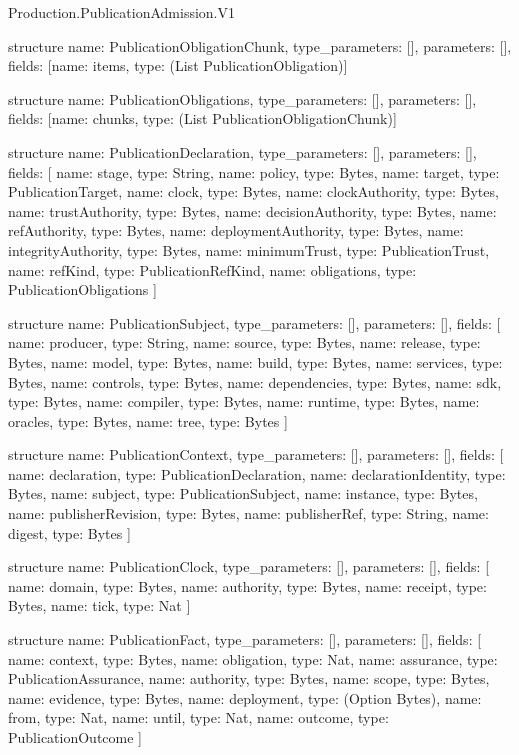 \begin{lexlean}{Production.PublicationAdmission.V1}
\begin{semanticmodule}
structure{
  name: PublicationObligationChunk,
  type_parameters: [],
  parameters: [],
  fields: [{name: items, type: (List PublicationObligation)}]
}

structure{
  name: PublicationObligations,
  type_parameters: [],
  parameters: [],
  fields: [{name: chunks, type: (List PublicationObligationChunk)}]
}

structure{
  name: PublicationDeclaration,
  type_parameters: [],
  parameters: [],
  fields: [
    {name: stage, type: String},
    {name: policy, type: Bytes},
    {name: target, type: PublicationTarget},
    {name: clock, type: Bytes},
    {name: clockAuthority, type: Bytes},
    {name: trustAuthority, type: Bytes},
    {name: decisionAuthority, type: Bytes},
    {name: refAuthority, type: Bytes},
    {name: deploymentAuthority, type: Bytes},
    {name: integrityAuthority, type: Bytes},
    {name: minimumTrust, type: PublicationTrust},
    {name: refKind, type: PublicationRefKind},
    {name: obligations, type: PublicationObligations}
  ]
}

structure{
  name: PublicationSubject,
  type_parameters: [],
  parameters: [],
  fields: [
    {name: producer, type: String},
    {name: source, type: Bytes},
    {name: release, type: Bytes},
    {name: model, type: Bytes},
    {name: build, type: Bytes},
    {name: services, type: Bytes},
    {name: controls, type: Bytes},
    {name: dependencies, type: Bytes},
    {name: sdk, type: Bytes},
    {name: compiler, type: Bytes},
    {name: runtime, type: Bytes},
    {name: oracles, type: Bytes},
    {name: tree, type: Bytes}
  ]
}

structure{
  name: PublicationContext,
  type_parameters: [],
  parameters: [],
  fields: [
    {name: declaration, type: PublicationDeclaration},
    {name: declarationIdentity, type: Bytes},
    {name: subject, type: PublicationSubject},
    {name: instance, type: Bytes},
    {name: publisherRevision, type: Bytes},
    {name: publisherRef, type: String},
    {name: digest, type: Bytes}
  ]
}

structure{
  name: PublicationClock,
  type_parameters: [],
  parameters: [],
  fields: [
    {name: domain, type: Bytes},
    {name: authority, type: Bytes},
    {name: receipt, type: Bytes},
    {name: tick, type: Nat}
  ]
}

structure{
  name: PublicationFact,
  type_parameters: [],
  parameters: [],
  fields: [
    {name: context, type: Bytes},
    {name: obligation, type: Nat},
    {name: assurance, type: PublicationAssurance},
    {name: authority, type: Bytes},
    {name: scope, type: Bytes},
    {name: evidence, type: Bytes},
    {name: deployment, type: (Option Bytes)},
    {name: from, type: Nat},
    {name: until, type: Nat},
    {name: outcome, type: PublicationOutcome}
  ]
}


\end{semanticmodule}
\end{lexlean}
